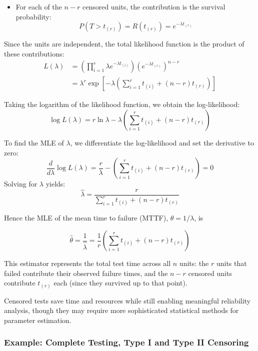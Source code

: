 \documentclass[twoside]{book}
\begin{document}
\begin{itemize}
\begin{itemize}
      \item For each of the $n - r$ censored units, the contribution is the survival probability:
      \[
      P(T > t_{(r)}) = R(t_{(r)}) = e^{-\lambda t_{(r)}}
      \]
    \end{itemize}

    Since the units are independent, the total likelihood function is the product of these contributions:
    \begin{align*}
    L(\lambda)
      &= \left( \prod_{i=1}^r \lambda e^{-\lambda t_{(i)}} \right)
         \left( e^{-\lambda t_{(r)}} \right)^{n - r} \\
      &= \lambda^r \exp\left[-\lambda \left( \sum_{i=1}^r t_{(i)} + (n - r)t_{(r)} \right) \right]
    \end{align*}

    Taking the logarithm of the likelihood function, we obtain the log-likelihood:
    \[
    \log L(\lambda)
    = r \ln \lambda - \lambda \left( \sum_{i=1}^r t_{(i)} + (n - r)t_{(r)} \right)
    \]

    To find the MLE of $\lambda$, we differentiate the log-likelihood and set the derivative to zero:
    \[
    \frac{d}{d\lambda} \log L(\lambda)
    = \frac{r}{\lambda} - \left( \sum_{i=1}^r t_{(i)} + (n - r)t_{(r)} \right) = 0
    \]
    Solving for $\lambda$ yields:
    \[
    \hat{\lambda}
    = \frac{r}{\displaystyle \sum_{i=1}^r t_{(i)} + (n - r)t_{(r)}}
    \]

    Hence the MLE of the mean time to failure (MTTF), \(\theta = 1/\lambda\), is
    \begin{textbox}
    \[
    \hat{\theta}
    = \frac{1}{\hat{\lambda}}
    = \frac{1}{r} \left( \sum_{i=1}^r t_{(i)} + (n - r)t_{(r)} \right)
    \]
    \end{textbox}


    This estimator represents the total test time across all $n$ units: the $r$ units that failed contribute their observed failure times, and the $n - r$ censored units contribute $t_{(r)}$ each (since they survived up to that point).

\end{itemize}


Censored tests save time and resources while still enabling meaningful reliability analysis, though they may require more sophisticated statistical methods for parameter estimation.

\subsubsection*{Example: Complete Testing, Type I and Type II Censoring}
\end{document}
